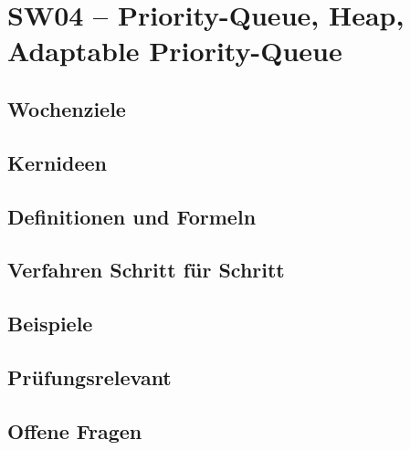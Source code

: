 \chapter{SW04 – Priority-Queue, Heap, Adaptable Priority-Queue}
\label{kap:sw04}

\section*{Wochenziele}
\begin{wochenziele}
\end{wochenziele}

\section{Kernideen}

\section{Definitionen und Formeln}

\section{Verfahren Schritt für Schritt}

\section{Beispiele}

\section{Prüfungsrelevant}

\section{Offene Fragen}
